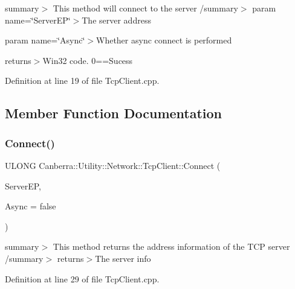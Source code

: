 summary$>$ This method will connect to the server /summary$>$ param name=\char`\"{}\+Server\+E\+P\char`\"{}$>$The server address

param name=\char`\"{}\+Async\char`\"{}$>$Whether async connect is performed

returns$>$Win32 code. 0==Sucess

Definition at line 19 of file Tcp\+Client.\+cpp.



\subsection{Member Function Documentation}
\mbox{\label{class_canberra_1_1_utility_1_1_network_1_1_tcp_client_a4105885041a405512c99fe6864cb054f_a4105885041a405512c99fe6864cb054f}} 
\subsubsection{\texorpdfstring{Connect()}{Connect()}}
{\footnotesize\ttfamily U\+L\+O\+NG Canberra\+::\+Utility\+::\+Network\+::\+Tcp\+Client\+::\+Connect (\begin{DoxyParamCaption}\item[{\hyperlink{class_canberra_1_1_utility_1_1_network_1_1_end_point}{End\+Point}}]{Server\+EP,  }\item[{bool}]{Async = {\ttfamily false} }\end{DoxyParamCaption})}

summary$>$ This method returns the address information of the T\+CP server /summary$>$ returns$>$The server info

Definition at line 29 of file Tcp\+Client.\+cpp.

\mbox{\label{class_canberra_1_1_utility_1_1_network_1_1_tcp_client_a068376947fe5eaf838713d3f1283223e_a068376947fe5eaf838713d3f1283223e}} 

